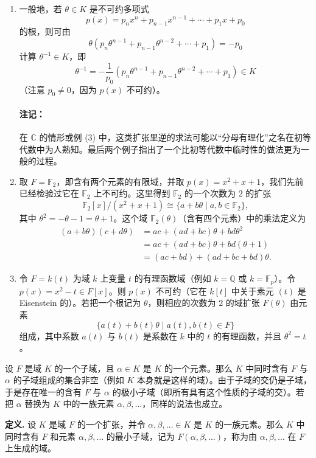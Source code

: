 \begin{enumerate}[label=(\arabic*)]
	\item 一般地，若 $\theta\in K$ 是不可约多项式
	\[
	p(x)=p_nx^n+p_{n-1}x^{n-1}+\cdots+p_1x+p_0
	\]
	的根，则可由
	\[
	\theta(p_n\theta^{n-1}+p_{n-1}\theta^{n-2}+\cdots+p_1)=-p_0
	\]
	计算 $\theta^{-1}\in K$，即
	\[
	\theta^{-1}=-\frac{1}{p_0}(p_n\theta^{n-1}+p_{n-1}\theta^{n-2}+\cdots+p_1)\in K
	\]
	（注意 $p_0\neq 0$，因为 $p(x)$ 不可约）。
	
	\paragraph{注记：} 在 $\mathbb C$ 的情形或例 (3) 中，这类扩张里逆的求法可能以“分母有理化”之名在初等代数中为人熟知。最后两个例子指出了一个比初等代数中临时性的做法更为一般的过程。
	
	\item 取 $F=\mathbb F_2$，即含有两个元素的有限域，并取 $p(x)=x^2+x+1$，我们先前已经检验过它在 $\mathbb F_2$ 上不可约。这里得到 $\mathbb F_2$ 的一个次数为 $2$ 的扩张
	\[
	\mathbb F_2[x]/(x^2+x+1)\cong\{a+b\theta\mid a,b\in\mathbb F_2\},
	\]
	其中 $\theta^2=-\theta-1=\theta+1$。这个域 $\mathbb F_2(\theta)$（含有四个元素）中的乘法定义为
	\[
	\begin{aligned}
		(a+b\theta)(c+d\theta)&=ac+(ad+bc)\theta+bd\theta^2\\
		&=ac+(ad+bc)\theta+bd(\theta+1)\\
		&=(ac+bd)+(ad+bc+bd)\theta.
	\end{aligned}
	\]
	
	\item 令 $F=k(t)$ 为域 $k$ 上变量 $t$ 的有理函数域（例如 $k=\mathbb Q$ 或 $k=\mathbb F_p$）。令 $p(x)=x^2-t\in F[x]$。则 $p(x)$ 不可约（它在 $k[t]$ 中关于素元 $(t)$ 是 Eisenstein 的）。若把一个根记为 $\theta$，则相应的次数为 $2$ 的域扩张 $F(\theta)$ 由元素
	\[
	\{a(t)+b(t)\theta\mid a(t),b(t)\in F\}
	\]
	组成，其中系数 $a(t)$ 与 $b(t)$ 是系数在 $k$ 中的 $t$ 的有理函数，并且 $\theta^2=t$。
\end{enumerate}

设 $F$ 是域 $K$ 的一个子域，且 $\alpha\in K$ 是 $K$ 的一个元素。那么 $K$ 中同时含有 $F$ 与 $\alpha$ 的子域组成的集合非空（例如 $K$ 本身就是这样的域）。由于子域的交仍是子域，于是存在唯一的含有 $F$ 与 $\alpha$ 的极小子域（即所有具有这个性质的子域的交）。若把 $\alpha$ 替换为 $K$ 中的一族元素 $\alpha,\beta,\ldots$，同样的说法也成立。

\noindent\textbf{定义.} 设 $K$ 是域 $F$ 的一个扩张，并令 $\alpha,\beta,\ldots\in K$ 是 $K$ 的一族元素。那么 $K$ 中同时含有 $F$ 和元素 $\alpha,\beta,
\ldots$ 的最小子域，记为 $F(\alpha,\beta,\ldots)$，称为由 $\alpha,\beta,\ldots$ 在 $F$ 上生成的域。

